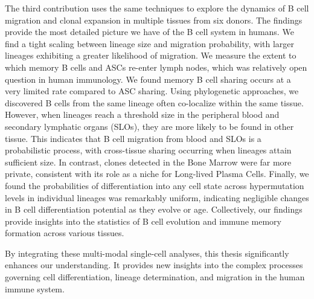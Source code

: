 The third contribution uses the same techniques to explore the dynamics of B cell migration and clonal expansion in multiple tissues from six donors. The findings provide the most detailed picture we have of the B cell system in humans. We find a tight scaling between lineage size and migration probability, with larger lineages exhibiting a greater likelihood of migration. We measure the extent to which memory B cells and ASCs re-enter lymph nodes, which was relatively open question in human immunology. We found memory B cell sharing occurs at a very limited rate compared to ASC sharing. Using phylogenetic approaches, we discovered B cells from the same lineage often co-localize within the same tissue. However, when lineages reach a threshold size in the peripheral blood and secondary lymphatic organs (SLOs), they are more likely to be found in other tissue. This indicates that B cell migration from blood and SLOs is a probabilistic process, with cross-tissue sharing occurring when lineages attain sufficient size. In contrast, clones detected in the Bone Marrow were far more private, consistent with its role as a niche for Long-lived Plasma Cells. Finally, we found the probabilities of differentiation into any cell state across hypermutation levels in individual lineages was remarkably uniform, indicating negligible changes in B cell differentiation potential as they evolve or age. Collectively, our findings provide insights into the statistics of B cell evolution and immune memory formation across various tissues.

By integrating these multi-modal single-cell analyses, this thesis significantly enhances our understanding. It provides new insights into the complex processes governing cell differentiation, lineage determination, and migration in the human immune system. 